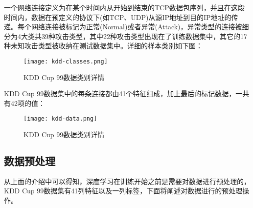 一个网络连接定义为在某个时间内从开始到结束的TCP数据包序列，并且在这段时间内，数据在预定义的协议下(如TCP、UDP)从源IP地址到目的IP地址的传递。每个网络连接被标记为正常(Normal)或者异常(Attack)，异常类型的连接被细分为4大类共39种攻击类型，其中22种攻击类型出现在了训练数据集中，其它的17种未知攻击类型被收纳在测试数据集中。详细的样本类别如下图：
\begin{figure}[H]
    \centering
    \texttt{[image: kdd-classes.png]}
    \caption{KDD Cup 99数据类别详情}
    \label{fig:kdd-classes}
\end{figure}

KDD Cup 99数据集中的每条连接都由41个特征组成，加上最后的标记数据，一共有42项的值：
\begin{figure}[H]
    \centering
    \texttt{[image: kdd-data.png]}
    \caption{KDD Cup 99数据类别详情}
    \label{fig:kdd-data}
\end{figure}

\subsection{数据预处理}

从上面的介绍中可以得知，深度学习在训练开始之前是需要对数据进行预处理的，KDD Cup 99数据集有41列特征以及一列标签，下面将阐述对数据进行的预处理操作。

